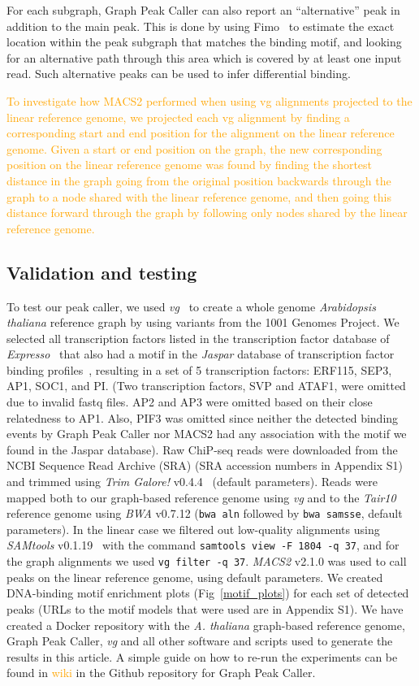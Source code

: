 \documentclass[10pt,letterpaper]{article}
\newcommand{\revision}[1]{\textcolor{orange}{#1}}
\begin{document}
For each subgraph, Graph Peak Caller can also report an “alternative” peak in addition to the main peak.
This is done by using Fimo~\cite{fimo} to estimate the exact location within the peak subgraph that matches the binding motif, and looking for an alternative path through this area which is covered by at least one input read.
Such alternative peaks can be used to infer differential binding.

\revision{To investigate how MACS2 performed when using vg alignments projected to the linear reference genome, we projected each vg alignment by finding a corresponding start and end position for the alignment on the linear reference genome. Given a start or end position on the graph, the new corresponding position on the linear reference genome was found by finding the shortest distance in the graph going from the original position backwards through the graph to a node shared with the linear reference genome, and then going this distance forward through the graph by following only nodes shared by the linear reference genome. }

\subsection*{Validation and testing}
To test our peak caller, we used \emph{vg}~\cite{vg} to create a whole genome \emph{Arabidopsis thaliana} reference graph by using variants from the 1001 Genomes Project.
We selected all transcription factors listed in the transcription factor database of \emph{Expresso}~\cite{expresso} that also had a motif in the \emph{Jaspar} database of transcription factor binding profiles~\cite{jaspar}, resulting in a set of 5 transcription factors: ERF115, SEP3, AP1, SOC1, and PI.
(Two transcription factors, SVP and ATAF1, were omitted due to invalid fastq files. AP2 and AP3 were omitted based on their close relatedness to AP1. Also, PIF3 was omitted since neither the detected binding events by Graph Peak Caller nor MACS2 had any association with the motif we found in the Jaspar database).
Raw ChiP-seq reads were downloaded from the NCBI Sequence Read Archive (SRA) (SRA accession numbers in Appendix S1) and trimmed using \emph{Trim Galore!} v0.4.4~\cite{trim_galore} (default parameters).
Reads were mapped both to our graph-based reference genome using \emph{vg} and to the \emph{Tair10}~\cite{tair} reference genome using \emph{BWA} v0.7.12 (\texttt{bwa aln} followed by \texttt{bwa samsse}, default parameters).
In the linear case we filtered out low-quality alignments using \emph{SAMtools} v0.1.19~\cite{samtools} with the command \texttt{samtools view -F 1804 -q 37}, and for the graph alignments we used \texttt{vg filter -q 37}.
\emph{MACS2} v2.1.0 was used to call peaks on the linear reference genome, using default parameters. We created DNA-binding motif enrichment plots (Fig~\ref{motif_plots}) for each set of detected peaks (URLs to the motif models that were used are in Appendix S1). We have created a Docker repository with the \emph{A. thaliana} graph-based reference genome, Graph Peak Caller, \emph{vg} and all other software and scripts used to generate the results in this article. A simple guide on how to re-run the experiments can be found in \revision{wiki} in the Github repository for Graph Peak Caller.
\end{document}
